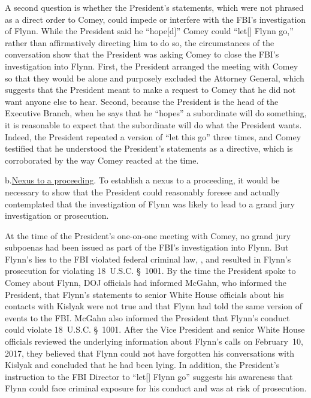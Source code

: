 A second question is whether the President's statements, which were not phrased as a direct order to Comey, could impede or interfere with the FBI's investigation of Flynn.
While the President said he ``hope[d]'' Comey could ``let[] Flynn go,'' rather than affirmatively directing him to do so, the circumstances of the conversation show that the President was asking Comey to close the FBI's investigation into Flynn.
First, the President arranged the meeting with Comey so that they would be alone and purposely excluded the Attorney General, which suggests that the President meant to make a request to Comey that he did not want anyone else to hear.
Second, because the President is the head of the Executive Branch, when he says that he ``hopes'' a subordinate will do something, it is reasonable to expect that the subordinate will do what the President wants.
Indeed, the President repeated a version of ``let this go'' three times, and Comey testified that he understood the President's statements as a directive, which is corroborated by the way Comey reacted at the time.

b.\qquad\underline{Nexus to a proceeding}.
To establish a nexus to a proceeding, it would be necessary to show that the President could reasonably foresee and actually contemplated that the investigation of Flynn was likely to lead to a grand jury investigation or prosecution.

At the time of the President's one-on-one meeting with Comey, no grand jury subpoenas had been issued as part of the FBI's investigation into Flynn.
But Flynn's lies to the FBI violated federal criminal law, , and resulted in Flynn's prosecution for violating 18~U.S.C. \S~1001.
By the time the President spoke to Comey about Flynn, DOJ officials had informed McGahn, who informed the President, that Flynn's statements to senior White House officials about his contacts with Kislyak were not true and that Flynn had told the same version of events to the FBI\null.
McGahn also informed the President that Flynn's conduct could violate 18~U.S.C. \S~1001.
After the Vice President and senior White House officials reviewed the underlying information about Flynn's calls on February~10, 2017, they believed that Flynn could not have forgotten his conversations with Kislyak and concluded that he had been lying.
In addition, the President's instruction to the FBI Director to ``let[] Flynn go'' suggests his awareness that Flynn could face criminal exposure for his conduct and was at risk of prosecution.

